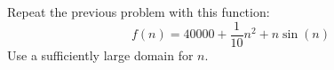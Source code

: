 Repeat the previous problem with this function:
\[
f(n) = 40000 + \frac{1}{10}n^2 + n \sin(n)
\]
Use a sufficiently large domain for $n$.
